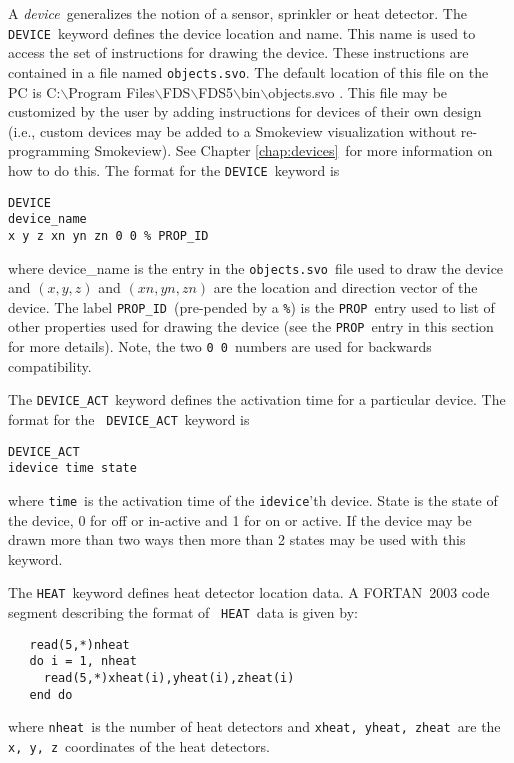 \documentclass[11pt,twoside]{book}
\begin{document}
{A {\em device}\ generalizes the notion of a sensor,
sprinkler or heat detector.  The {\tt DEVICE}\ keyword defines the
device location and name.  This name is used to access the set of
instructions for drawing the device.  These instructions are
contained in a file named {\tt objects.svo}. The default location
of this file on the PC is
C:$\backslash$Program Files$\backslash$FDS$\backslash$FDS5$\backslash$bin$\backslash$objects.svo . This
file may be customized by the user by adding instructions for
devices of their own design (i.e., custom devices may be
added to a Smokeview visualization without re-programming
Smokeview). See Chapter \ref{chap:devices}\ for more information on how to do this. The
format for the {\tt DEVICE}\ keyword is

\begin{lstlisting}
DEVICE
device_name
x y z xn yn zn 0 0 % PROP_ID
\end{lstlisting}

\noindent where device\_name is the entry in the {\tt objects.svo}\ file used
to draw the device and $(x,y,z)$ and $(xn,yn,zn)$
are the location and direction vector of the device.
The label
{\tt PROP\_ID}\ (pre-pended by a {\tt \%}) is the {\tt PROP}\ entry used to
list of other properties used
for drawing the device
(see the {\tt PROP}\ entry in this section for more details).
Note, the two {\tt 0 0}\ numbers are used for backwards compatibility.

The {\tt DEVICE\_ACT}\ keyword defines the
activation time for a particular device. The format for the {\tt
DEVICE\_ACT}\ keyword is
\begin{lstlisting}
DEVICE_ACT
idevice time state
\end{lstlisting}
where {\tt time}\ is the activation time of the {\tt idevice}'th device.
State is the state of the device, 0 for off or in-active and 1 for
on or active.  If the device may be drawn more than two ways then
more than 2 states may be used with this keyword.

The {\tt HEAT}\ keyword defines heat detector location
data. A FORTAN~2003 code segment describing the format of {\tt
HEAT}\ data is given by:
\begin{lstlisting}
   read(5,*)nheat
   do i = 1, nheat
     read(5,*)xheat(i),yheat(i),zheat(i)
   end do
\end{lstlisting}
where {\tt nheat}\ is the number of heat detectors and
{\tt xheat, yheat, zheat}\ are the {\tt x, y, z}\
coordinates of the heat detectors.

}
\end{document}
